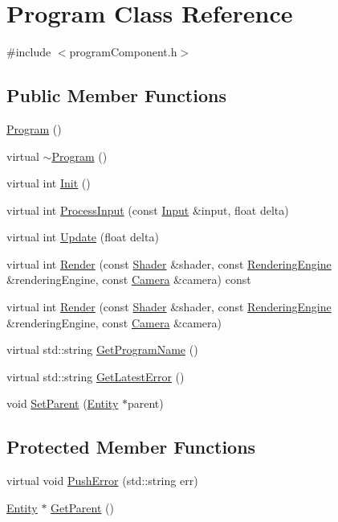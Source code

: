 \hypertarget{class_program}{}\section{Program Class Reference}
\label{class_program}


{\ttfamily \#include $<$program\+Component.\+h$>$}

\subsection*{Public Member Functions}
\begin{DoxyCompactItemize}
\item 
\hyperlink{class_program_aaefaa0df08f3484476fc4d61e97acbdc}{Program} ()
\item 
virtual \hyperlink{class_program_a2df844d46504a414498c2140de94bfef}{$\sim$\+Program} ()
\item 
virtual int \hyperlink{class_program_adb84adf35f67b0b49e2647a378480e93}{Init} ()
\item 
virtual int \hyperlink{class_program_aca3103ac8fc4b4b982b5f7e70df30584}{Process\+Input} (const \hyperlink{class_input}{Input} \&input, float delta)
\item 
virtual int \hyperlink{class_program_a0398d9957f8da7fb37ea77acf8bac342}{Update} (float delta)
\item 
virtual int \hyperlink{class_program_a79eb729b98fa474234fdbe4404d2f2a9}{Render} (const \hyperlink{class_shader}{Shader} \&shader, const \hyperlink{class_rendering_engine}{Rendering\+Engine} \&rendering\+Engine, const \hyperlink{class_camera}{Camera} \&camera) const 
\item 
virtual int \hyperlink{class_program_a29cf518215935cac6db281732f876871}{Render} (const \hyperlink{class_shader}{Shader} \&shader, const \hyperlink{class_rendering_engine}{Rendering\+Engine} \&rendering\+Engine, const \hyperlink{class_camera}{Camera} \&camera)
\item 
virtual std\+::string \hyperlink{class_program_aacda59ac678fb196f9d5cf89e9a42885}{Get\+Program\+Name} ()
\item 
virtual std\+::string \hyperlink{class_program_a97d6284ddd0a4abec1041b9fca178829}{Get\+Latest\+Error} ()
\item 
void \hyperlink{class_program_ad57322336bab7b5ec5b68857ddfe74ee}{Set\+Parent} (\hyperlink{class_entity}{Entity} $\ast$parent)
\end{DoxyCompactItemize}
\subsection*{Protected Member Functions}
\begin{DoxyCompactItemize}
\item 
virtual void \hyperlink{class_program_aee307e293b04d3e47218d30d6871e6f7}{Push\+Error} (std\+::string err)
\item 
\hyperlink{class_entity}{Entity} $\ast$ \hyperlink{class_program_a58a5d26f7d63df786edacb2332c9e594}{Get\+Parent} ()
\end{DoxyCompactItemize}
